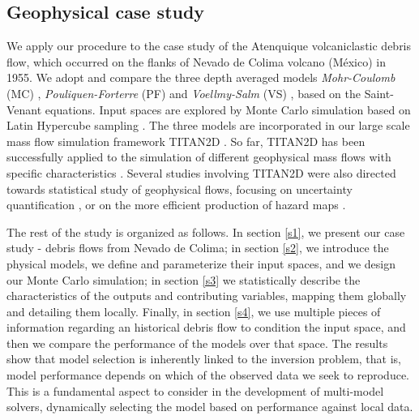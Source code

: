 \documentclass[nhess, manuscript]{copernicus}
\begin{document}
\subsection{Geophysical case study}
We apply our procedure to the case study of the Atenquique volcaniclastic debris flow, which occurred on the flanks of Nevado de Colima volcano (M\'exico) in 1955. We adopt and compare the three depth averaged models \emph{Mohr-Coulomb} (MC) \citep{SavageHutter1989}, \emph{Pouliquen-Forterre} (PF) \citep{Pouliquen1999, ForterrePouliquen2002, PouliquenForterre2002} and \emph{Voellmy-Salm} (VS) \citep{Voellmy1955, Salm1990}, based on the Saint-Venant equations. Input spaces are explored by Monte Carlo simulation based on Latin Hypercube sampling \citep{McKay1979,Owen1992b,Stein1987,Ranjan2014,Mingyao2016}. The three models are incorporated in our large scale mass flow simulation framework  TITAN2D \citep{Patra2005,Patra2006,Yu2009,Aghakhani2016,Patra2018}. So far, TITAN2D has been successfully applied to the simulation of different geophysical mass flows with specific characteristics \citep{Sheridan2005, Rupp2006, Norini2008, Charbonnier2009, Procter2010, Sheridan2010, Sulpizio2010, Capra2011}. Several studies involving TITAN2D were also directed towards statistical study of geophysical flows, focusing on uncertainty quantification \citep{Dalbey2008, Dalbey2009, Stefanescu2012b, Stefanescu2012a}, or on the more efficient production of hazard maps \citep{Bayarri2009, Spiller2014, Bayarri2015, Ogburn2016}.


The rest of the study is organized as follows. In section \ref{s1}, we present our case study - debris flows from Nevado de Colima; in section \ref{s2}, we introduce the physical models, we define and parameterize their input spaces, and we design our Monte Carlo simulation; in section \ref{s3} we statistically describe the characteristics of the outputs and contributing variables, mapping them globally and detailing them locally.  Finally, in section \ref{s4}, we use multiple pieces of information regarding an historical debris flow to condition the input space, and then we compare the performance of the models over that space. The results show that model selection is inherently linked to the inversion problem, that is, model performance depends on which of the observed data we seek to reproduce. This is a fundamental aspect to consider in the development of multi-model solvers, dynamically selecting the model based on performance against local data.
\end{document}
